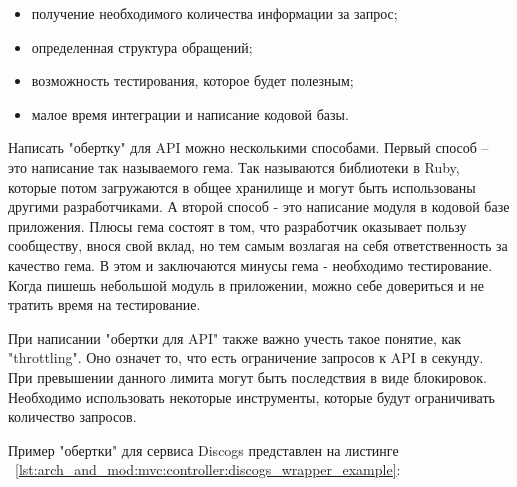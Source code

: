 \begin{itemize}
  \item получение необходимого количества информации за запрос;
  \item определенная структура обращений;
  \item возможность тестирования, которое будет полезным;
  \item малое время интеграции и написание кодовой базы.
\end{itemize}

Написать "обертку" для API можно несколькими способами. Первый способ -- это написание так называемого гема. Так называются библиотеки в Ruby, которые потом загружаются в общее хранилище и могут быть использованы другими разработчиками. А второй способ - это написание модуля в кодовой базе приложения. Плюсы гема состоят в том, что разработчик оказывает пользу сообществу, внося свой вклад, но тем самым возлагая на себя ответственность за качество гема. В этом и заключаются минусы гема - необходимо тестирование. Когда пишешь небольшой модуль в приложении, можно себе довериться и не тратить время на тестирование.

При написании "обертки для API" также важно учесть такое понятие, как "throttling". Оно означет то, что есть ограничение запросов к API в секунду. При превышении данного лимита могут быть последствия в виде блокировок. Необходимо использовать некоторые инструменты, которые будут ограничивать количество запросов.

Пример "обертки" для сервиса Discogs представлен на листинге ~\ref{lst:arch_and_mod:mvc:controller:discogs_wrapper_example}:


